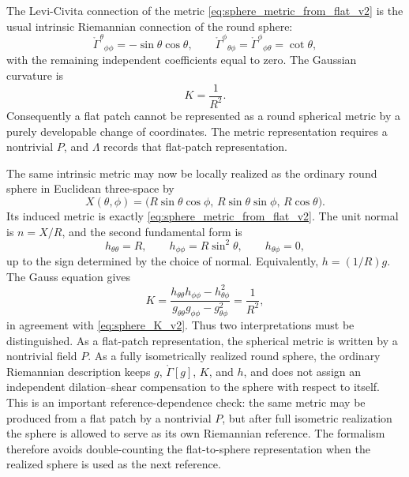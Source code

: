 \documentclass[12pt]{amsart}
\theoremstyle{definition}
\theoremstyle{remark}
\begin{document}
The Levi-Civita connection of the metric \eqref{eq:sphere_metric_from_flat_v2} is the usual intrinsic Riemannian connection of the round sphere:
\begin{equation}\label{eq:sphere_LC_coeffs_v2}
 \mathring\Gamma^{\theta}{}_{\phi\phi}=-\sin\theta\cos\theta,
 \qquad
 \mathring\Gamma^{\phi}{}_{\theta\phi}=\mathring\Gamma^{\phi}{}_{\phi\theta}=\cot\theta,
\end{equation}
with the remaining independent coefficients equal to zero.  The Gaussian curvature is
\begin{equation}\label{eq:sphere_K_v2}
 K=\frac1{R^2} .
\end{equation}
Consequently a flat patch cannot be represented as a round spherical metric by a purely developable change of coordinates.  The metric representation requires a nontrivial \(P\), and \(\Lambda\) records that flat-patch representation.

The same intrinsic metric may now be locally realized as the ordinary round sphere in Euclidean three-space by
\begin{equation}\label{eq:round_sphere_embedding_chain_v2}
 X(\theta,\phi)=
 \bigl(R\sin\theta\cos\phi,\,R\sin\theta\sin\phi,\,R\cos\theta\bigr).
\end{equation}
Its induced metric is exactly \eqref{eq:sphere_metric_from_flat_v2}.  The unit normal is \(n=X/R\), and the second fundamental form is
\begin{equation}\label{eq:round_sphere_second_fundamental_v2}
 h_{\theta\theta}=R,\qquad
 h_{\phi\phi}=R\sin^2\theta,\qquad
 h_{\theta\phi}=0,
\end{equation}
up to the sign determined by the choice of normal.  Equivalently, \(h=(1/R)g\).  The Gauss equation gives
\begin{equation}
 K=\frac{h_{\theta\theta}h_{\phi\phi}-h_{\theta\phi}^2}
        {g_{\theta\theta}g_{\phi\phi}-g_{\theta\phi}^2}
  =\frac1{R^2},
\end{equation}
in agreement with \eqref{eq:sphere_K_v2}.  Thus two interpretations must be distinguished.  As a flat-patch representation, the spherical metric is written by a nontrivial field \(P\).  As a fully isometrically realized round sphere, the ordinary Riemannian description keeps \(g\), \(\mathring\Gamma[g]\), \(K\), and \(h\), and does not assign an independent dilation--shear compensation to the sphere with respect to itself.  This is an important reference-dependence check: the same metric may be produced from a flat patch by a nontrivial \(P\), but after full isometric realization the sphere is allowed to serve as its own Riemannian reference.  The formalism therefore avoids double-counting the flat-to-sphere representation when the realized sphere is used as the next reference.
\end{document}
